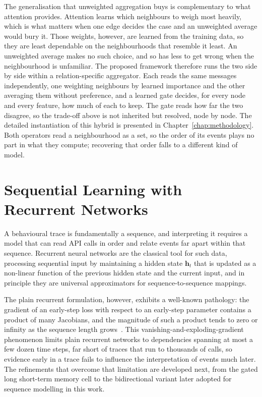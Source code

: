 \documentclass[%
    BCOR=10mm,
    DIV=13,
    toc=bibliography,
    toc=listof,
    oneside,
    12pt,
]{scrbook}
\begin{document}
The generalisation that unweighted aggregation buys is complementary to what
attention provides. Attention learns which neighbours to weigh most heavily,
which is what matters when one edge decides the case and an unweighted average
would bury it. Those weights, however, are learned from the training data, so
they are least dependable on the neighbourhoods that resemble it least. An
unweighted average makes no such choice, and so has less to get wrong when the
neighbourhood is unfamiliar. The proposed framework therefore runs the two
side by side within a relation-specific aggregator. Each reads the same
messages independently, one weighting neighbours by learned importance and the
other averaging them without preference, and a learned gate decides, for every
node and every feature, how much of each to keep. The gate reads how far the
two disagree, so the trade-off above is not inherited but resolved, node by
node. The detailed instantiation of this hybrid is presented in
Chapter~\ref{chap:methodology}. Both operators read a neighbourhood as a set,
so the order of its events plays no part in what they compute; recovering that
order falls to a different kind of model.

\section{Sequential Learning with Recurrent Networks}
\label{sec:lstm}

A behavioural trace is fundamentally a sequence, and interpreting it requires a
model that can read API calls in order and relate events far apart within that
sequence. Recurrent neural networks are the classical tool for such data,
processing sequential input by maintaining a hidden state $\mathbf{h}_t$ that is
updated as a non-linear function of the previous hidden state and the current
input, and in principle they are universal approximators for sequence-to-sequence
mappings.

The plain recurrent formulation, however, exhibits a well-known pathology: the
gradient of an early-step loss with respect to an early-step parameter contains
a product of many Jacobians, and the magnitude of such a product tends to zero
or infinity as the sequence length grows~\cite{bengio1994}. This
vanishing-and-exploding-gradient
phenomenon limits plain recurrent networks to dependencies spanning at most a
few dozen time steps, far short of traces that run to thousands of calls, so
evidence early in a trace fails to influence the interpretation of events much
later. The refinements that overcome that limitation are developed next, from
the gated long short-term memory cell to the bidirectional variant later adopted
for sequence modelling in this work.
\end{document}
